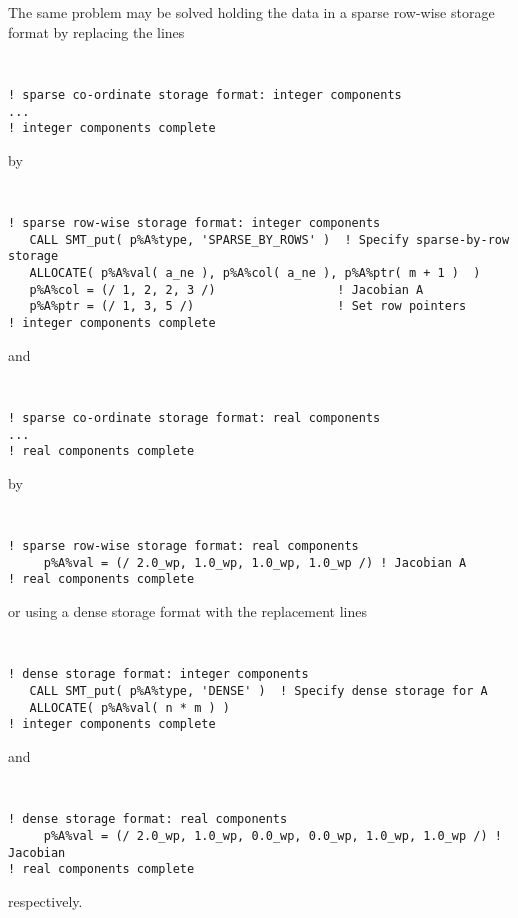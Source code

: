 \documentclass{galahad}
\begin{document}
\noindent
The same problem may be solved holding the data in 
a sparse row-wise storage format by replacing the lines
{\tt \small
\begin{verbatim}
! sparse co-ordinate storage format: integer components
...
! integer components complete 
\end{verbatim}
}
\noindent
by
{\tt \small
\begin{verbatim}
! sparse row-wise storage format: integer components
   CALL SMT_put( p%A%type, 'SPARSE_BY_ROWS' )  ! Specify sparse-by-row storage
   ALLOCATE( p%A%val( a_ne ), p%A%col( a_ne ), p%A%ptr( m + 1 )  )
   p%A%col = (/ 1, 2, 2, 3 /)                 ! Jacobian A
   p%A%ptr = (/ 1, 3, 5 /)                    ! Set row pointers  
! integer components complete
\end{verbatim}
}
\noindent
and
{\tt \small
\begin{verbatim}
! sparse co-ordinate storage format: real components
...
! real components complete   
\end{verbatim}
}
\noindent
by
{\tt \small
\begin{verbatim}
! sparse row-wise storage format: real components
     p%A%val = (/ 2.0_wp, 1.0_wp, 1.0_wp, 1.0_wp /) ! Jacobian A
! real components complete   
\end{verbatim}
}
\noindent
or using a dense storage format with the replacement lines
{\tt \small
\begin{verbatim}
! dense storage format: integer components
   CALL SMT_put( p%A%type, 'DENSE' )  ! Specify dense storage for A
   ALLOCATE( p%A%val( n * m ) )
! integer components complete
\end{verbatim}
}
\noindent
and 
{\tt \small
\begin{verbatim}
! dense storage format: real components
     p%A%val = (/ 2.0_wp, 1.0_wp, 0.0_wp, 0.0_wp, 1.0_wp, 1.0_wp /) ! Jacobian
! real components complete   
\end{verbatim}
}
\noindent
respectively.
\end{document}
